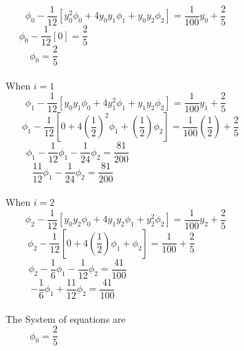 \documentclass[a4paper,12pt]{report}
\begin{document}
	$$
		\phi_0 - \frac{1}{12} \left[y_0^2 \phi_0 + 4y_0y_1\phi_1 + y_0y_2\phi_2\right] = \frac{1}{100}y_0 + \frac{2}{5}\quad\quad\quad\quad\quad\quad\quad\quad\quad\quad\quad
	$$
	$$
		\phi_0 - \frac{1}{12}[0] = \frac{2}{5}\quad\quad\quad\quad\quad\quad\quad\quad\quad\quad\quad\quad\quad\quad\quad\quad\quad\quad\quad\quad\quad\quad\quad\quad\quad\quad
	$$
	\begin{equation}
		\phi_0 = \frac{2}{5}\quad\quad\quad\quad\quad\quad\quad\quad\quad\quad\quad\quad\quad\quad\quad\quad\quad\quad\quad\quad\quad\quad\quad\quad\quad\quad\quad\quad \tag{i}
	\end{equation}
	\\When $i=1$
	$$
		\phi_1 - \frac{1}{12} \left[y_0y_1 \phi_0 + 4y_1^2\phi_1 + y_1y_2\phi_2\right] = \frac{1}{100}y_1 + \frac{2}{5}\quad\quad\quad\quad\quad\quad\quad\quad\quad\quad\quad
	$$
	$$
		\phi_1 - \frac{1}{12}\left[0 + 4\left(\frac{1}{2}\right)^2\phi_1 + \left(\frac{1}{2}\right)\phi_2\right] = \frac{1}{100}\left(\frac{1}{2}\right) + \frac{2}{5}\quad\quad\quad\quad\quad\quad\quad\quad\quad\quad
	$$
	$$
		\phi_1 - \frac{1}{12}\phi_1 - \frac{1}{24}\phi_2 = \frac{81}{200}\quad\quad\quad\quad\quad\quad\quad\quad\quad\quad\quad\quad\quad\quad\quad\quad\quad\quad\quad\quad\quad
	$$
	\begin{equation}
		\frac{11}{12}\phi_1 - \frac{1}{24}\phi_2 = \frac{81}{200}\quad\quad\quad\quad\quad\quad\quad\quad\quad\quad\quad\quad\quad\quad\quad\quad\quad\quad\quad\quad\quad\quad \tag{ii}
	\end{equation}
	\\When $i=2$
	$$
		\phi_2 - \frac{1}{12} \left[y_0y_2 \phi_0 + 4y_1y_2\phi_1 + y_2^2\phi_2\right] = \frac{1}{100}y_2 + \frac{2}{5}\quad\quad\quad\quad\quad\quad\quad\quad\quad\quad\quad
	$$
	$$
		\phi_2 - \frac{1}{12}\left[0 + 4\left(\frac{1}{2}\right)\phi_1 + \phi_2 \right] = \frac{1}{100} +  \frac{2}{5}\quad\quad\quad\quad\quad\quad\quad\quad\quad\quad\quad\quad\quad \quad
	$$
	$$
		\phi_2 - \frac{1}{6}\phi_1 - \frac{1}{12}\phi_2 = \frac{41}{100}\quad\quad\quad\quad\quad\quad\quad\quad\quad\quad\quad\quad\quad\quad\quad\quad\quad\quad\quad\quad\quad
	$$
	\begin{equation}
		-\frac{1}{6}\phi_1 + \frac{11}{12}\phi_2 = \frac{41}{100}\quad\quad\quad\quad\quad\quad\quad\quad\quad\quad\quad\quad\quad\quad\quad\quad\quad\quad\quad\quad\quad\quad \tag{iii}
	\end{equation}
	\\The System of equations are
	\begin{equation}
		\phi_0 = \frac{2}{5}\quad\quad\quad\quad\quad\quad\quad\quad\quad\quad\quad\quad\quad\quad\quad\quad\quad\quad\quad\quad\quad\quad\quad\quad\quad\quad\quad\quad \tag{i}
	\end{equation}
\end{document}
